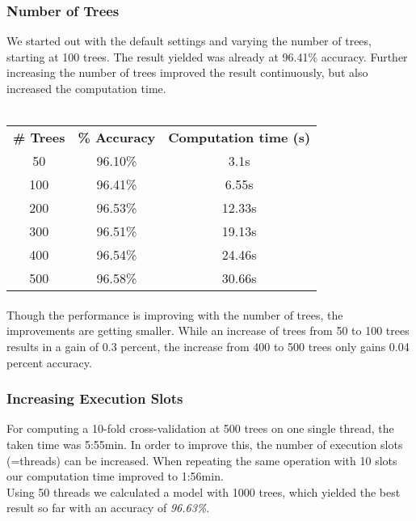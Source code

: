 \documentclass{article}
\begin{document}
\subsubsection{Number of Trees} We started out with the default settings and varying the number of trees, starting at 100 trees. The result yielded was already at 96.41\% accuracy. Further increasing the number of trees improved the result continuously, but also increased the computation time. 
\\\\
\begin{center}
\begin{tabular}{ c | c | c }
\textbf{\# Trees} & \textbf{\% Accuracy} & \textbf{Computation time (s)} \\
50 & 96.10\% & 3.1s \\
100 & 96.41\% & 6.55s \\
200 & 96.53\% & 12.33s \\
300 & 96.51\% & 19.13s \\
400 & 96.54\% & 24.46s \\
500 & 96.58\% & 30.66s\\
\end{tabular}
\end{center}

\paragraph{}Though the performance is improving with the number of trees, the improvements are getting smaller. While an increase of trees from 50 to 100 trees results in a gain of 0.3 percent, the increase from 400 to 500 trees only gains 0.04 percent accuracy. 
\subsubsection{Increasing Execution Slots}For computing a 10-fold cross-validation at 500 trees on one single thread, the taken time was 5:55min. In order to improve this, the number of execution slots (=threads) can be increased. When repeating the same operation with 10 slots our computation time improved to 1:56min. \\
Using 50 threads we calculated a model with 1000 trees, which yielded the best result so far with an accuracy of \emph{96.63\%}. 
\end{document}
